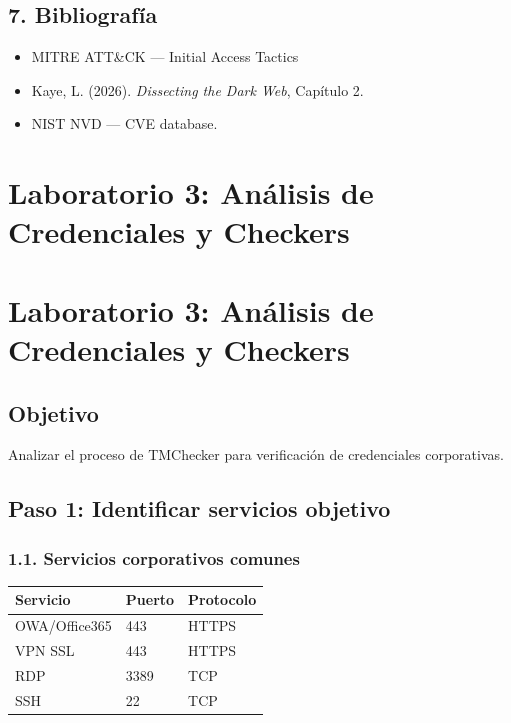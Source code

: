 \documentclass[
  letterpaper,
]{report}
\newcounter{none} %
\providecommand{\tightlist}{%
  \setlength{\itemsep}{0pt}\setlength{\parskip}{0pt}}
\begin{document}
\section{7. Bibliografía}\label{bibliografuxeda-3}

\begin{itemize}
\tightlist
\item
  MITRE ATT\&CK --- Initial Access Tactics
\item
  Kaye, L. (2026). \emph{Dissecting the Dark Web}, Capítulo 2.
\item
  NIST NVD --- CVE database.
\end{itemize}

\chapter{Laboratorio 3: Análisis de Credenciales y
Checkers}\label{laboratorio-3-anuxe1lisis-de-credenciales-y-checkers}

\chapter{Laboratorio 3: Análisis de Credenciales y
Checkers}\label{laboratorio-3-anuxe1lisis-de-credenciales-y-checkers-1}

\section{Objetivo}\label{objetivo-2}

Analizar el proceso de TMChecker para verificación de credenciales
corporativas.

\section{Paso 1: Identificar servicios
objetivo}\label{paso-1-identificar-servicios-objetivo}

\subsection{1.1. Servicios corporativos
comunes}\label{servicios-corporativos-comunes}

{\def\LTcaptype{none} %
\begin{longtable}[]{@{}lll@{}}
\toprule\noalign{}
Servicio & Puerto & Protocolo \\
\midrule\noalign{}
\endhead
\bottomrule\noalign{}
\endlastfoot
OWA/Office365 & 443 & HTTPS \\
VPN SSL & 443 & HTTPS \\
RDP & 3389 & TCP \\
SSH & 22 & TCP \\
\end{longtable}
}
\end{document}
